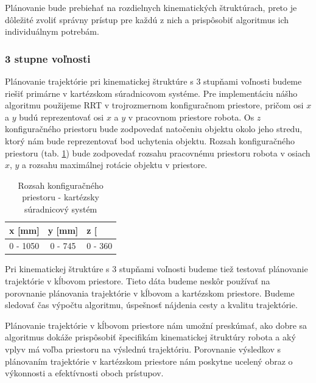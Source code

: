 Plánovanie bude prebiehať na rozdielnych kinematických štruktúrach, preto je dôležité zvoliť správny prístup pre každú z nich a prispôsobiť algoritmus ich individuálnym potrebám.

 
\subsubsection{3 stupne voľnosti}

Plánovanie trajektórie pri kinematickej štruktúre s 3 stupňami voľnosti budeme riešiť primárne v kartézskom súradnicovom systéme. Pre implementáciu nášho algoritmu použijeme RRT v trojrozmernom konfiguračnom priestore, pričom osi $x$ a $y$ budú reprezentovať osi $x$ a $y$ v pracovnom priestore robota. Os $z$ konfiguračného priestoru bude zodpovedať natočeniu objektu okolo jeho stredu, ktorý nám bude reprezentovať bod uchytenia objektu. Rozsah konfiguračného priestoru (tab. \ref{table 3.1}) bude zodpovedať rozsahu pracovnému priestoru robota v osiach $x$, $y$ a rozsahu maximálnej rotácie objektu v priestore.

\begin{table}[h!]
	\centering
	\begin{tabular}{|c|c|c|}
		\hline
		\multicolumn{1}{|l|}{x {[}mm{]}}  & \multicolumn{1}{l|}{y {[}mm{]}} & \multicolumn{1}{l|}{z {[}\degree{]}} \\ \hline
		0 - 1050                                              & 0 - 745                                             & 0 - 360                              \\ \hline

	\end{tabular}
	\caption{Rozsah konfiguračného priestoru - kartézsky súradnicový systém}\label{table 3.1} 
\end{table}

Pri kinematickej štruktúre s 3 stupňami voľnosti budeme tiež testovať plánovanie trajektórie v kĺbovom priestore. Tieto dáta budeme neskôr používať na porovnanie plánovania trajektórie v kĺbovom a kartézskom priestore. Budeme sledovať čas výpočtu algoritmu, úspešnosť nájdenia cesty a kvalitu trajektórie.

Plánovanie trajektórie v kĺbovom priestore nám umožní preskúmať, ako dobre sa algoritmus dokáže prispôsobiť špecifikám kinematickej štruktúry robota a aký vplyv má voľba priestoru na výslednú trajektóriu. Porovnanie výsledkov s plánovaním trajektórie v kartézskom priestore nám poskytne ucelený obraz o výkonnosti a efektívnosti oboch prístupov.

